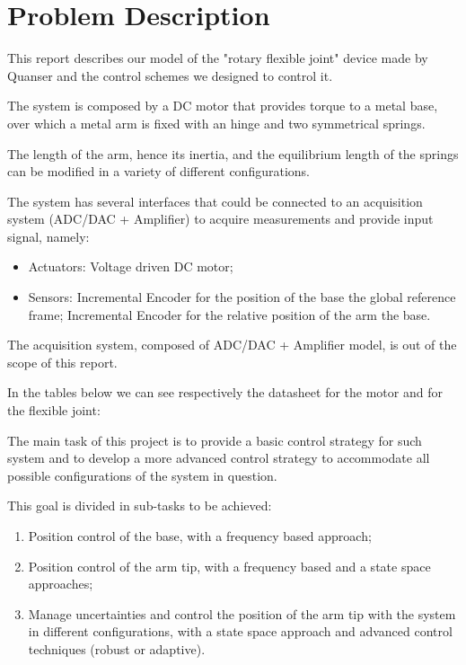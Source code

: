 \chapter{Problem Description}
\label{cha:problem_description}

    This report describes our model of the "rotary flexible joint" device made by Quanser and the control schemes we designed to control it.

    The system is composed by a DC motor that provides torque to a metal base, over which a metal arm is fixed with an hinge and two symmetrical springs.

    The length of the arm, hence its inertia, and the equilibrium length of the springs can be modified in a variety of different configurations.

    The system has several interfaces that could be connected to an acquisition system (ADC/DAC + Amplifier) to acquire measurements and provide input signal, namely:
    \begin{itemize}
        \item Actuators:
            \subitem Voltage driven DC motor;
        \item Sensors:
            \subitem Incremental Encoder for the position of the base \wrt the global reference frame;
            \subitem Incremental Encoder for the relative position of the arm \wrt the base.
    \end{itemize}
    The acquisition system, composed of ADC/DAC + Amplifier model, is out of the scope of this report.

    In the tables below we can see respectively the datasheet for the motor and for the flexible joint:


    The main task of this project is to provide a basic control strategy for such system and to develop a more advanced control strategy to accommodate all possible configurations of the system in question.
    
    This goal is divided in sub-tasks to be achieved:
    \begin{enumerate}
        \item Position control of the base, with a frequency based approach;
        \item Position control of the arm tip, with a frequency based and a state space approaches;
        \item Manage uncertainties and control the position of the arm tip with the system in different configurations, with a state space approach and advanced control techniques (robust or adaptive).
    \end{enumerate}





